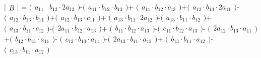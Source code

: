 \documentclass[11pt]{article}
\begin{document}
    \(\bigl|\begin{matrix}B\end{matrix}\bigr|\) =
\(\bigl(\begin{matrix}a_{11} & b_{12} \cdot 2a_{13}\end{matrix}\bigr)\)-\(\bigl(\begin{matrix}a_{11} \cdot b_{12} \cdot b_{13}\end{matrix}\bigr)\)+
\(\bigl(\begin{matrix}a_{11} \cdot b_{12} \cdot c_{13}\end{matrix}\bigr)\)+\(\bigl(\begin{matrix}a_{12} \cdot b_{13} \cdot 2a_{11}\end{matrix}\bigr)\)-
\(\bigl(\begin{matrix}a_{12} \cdot b_{13} \cdot b_{11}\end{matrix}\bigr)\)+\(\bigl(\begin{matrix}a_{12} \cdot b_{13} \cdot c_{11}\end{matrix}\bigr)\)+
\(\bigl(\begin{matrix}a_{13} \cdot b_{11} \cdot 2a_{12}\end{matrix}\bigr)\)-\(\bigl(\begin{matrix}a_{13} \cdot b_{11} \cdot b_{12}\end{matrix}\bigr)\)+
\(\bigl(\begin{matrix}a_{13} \cdot b_{11} \cdot c_{12}\end{matrix}\bigr)\)-\(\bigl(\begin{matrix}2a_{11} \cdot b_{12} \cdot a_{13}\end{matrix}\bigr)\)+
\(\bigl(\begin{matrix}b_{11} \cdot b_{12} \cdot a_{13}\end{matrix}\bigr)\)-\(\bigl(\begin{matrix}c_{11} \cdot b_{12} \cdot a_{13}\end{matrix}\bigr)\)-
\(\bigl(\begin{matrix}2a_{12} \cdot b_{13} \cdot a_{11}\end{matrix}\bigr)\)+\(\bigl(\begin{matrix}b_{12} \cdot b_{13} \cdot a_{11}\end{matrix}\bigr)\)-
\(\bigl(\begin{matrix}c_{12} \cdot b_{13} \cdot a_{11}\end{matrix}\bigr)\)-\(\bigl(\begin{matrix}2a_{13} \cdot b_{11} \cdot a_{12}\end{matrix}\bigr)\)+
\(\bigl(\begin{matrix}b_{13} \cdot b_{11} \cdot a_{12}\end{matrix}\bigr)\)-\(\bigl(\begin{matrix}c_{13} \cdot b_{11} \cdot a_{12}\end{matrix}\bigr)\)
\end{document}
